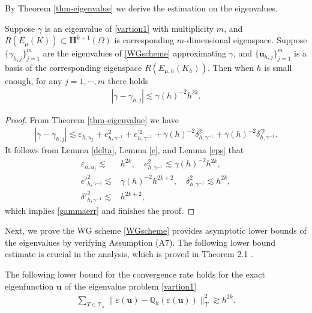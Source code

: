 \documentclass[leqno,CJK]{siamltex704}
\numberwithin{equation}{section}
\def\dQ{{\mathbb{Q}}}
\def\sumT{\sum_{T\in\mathcal{T}_h}}     %
\def\bu{{\mathbf{u}}}
\def\bh{{\mathbf{H}}}
\newcommand{\eps}{\varepsilon}
\begin{document}
By Theorem \ref{thm-eigenvalue} we derive the estimation on the eigenvalues.
\begin{theorem}\label{eigenvalue}
	Suppose $\gamma$ is an eigenvalue of \eqref{vartion1} with multiplicity $m$,
	and $R(E_\mu(K))\subset \bh^{k+1}(\Omega)$ is corresponding $m$-dimensional eigenspace. Suppose $\{\gamma_{h,j}\}_{j=1}^m$
	are the eigenvalues of \eqref{WGscheme} approximating $\gamma$, and $\{\bu_{h,j}\}_{j=1}^m$ is
	a basis of the corresponding eigenspace $R(E_{\mu,h}(K_h))$. Then when $h$ is  small enough, for any $j=1,\cdots,m$ there
	holds
	\begin{eqnarray}\label{gammaerr}
		|\gamma-\gamma_{h,j}|\lesssim \gamma(h)^{-2}h^{2k}.
	\end{eqnarray}
\end{theorem}
\begin{proof}
	From Theorem \ref{thm-eigenvalue} we have
	\begin{eqnarray*}
		|\gamma-\gamma_{h,j}|\lesssim \varepsilon_{h,u_j} + e_{h,\gamma^{-1}}^2 + e^{\prime 2}_{h,\gamma^{-1}}+ \gamma(h)^{-2} \delta_{h,\gamma^{-1}}^2+ \gamma(h)^{-2} \delta^{\prime 2}_{h,\gamma^{-1}}.
	\end{eqnarray*}
	It follows from Lemma \ref{delta}, Lemma \ref{e}, and Lemma \ref{eps} that
	\begin{align*}
		\varepsilon_{h,u_j} \lesssim & h^{2k},\quad
		e_{h,\gamma^{-1}}^2 \lesssim \gamma(h)^{-2}h^{2k},
		\\
		e'^2_{h,\gamma^{-1}} \lesssim & \gamma(h)^{-2}h^{2k+2},\quad
		\delta_{h,\gamma^{-1}}^2\lesssim h^{2k},
		\\
		\delta'^2_{h,\gamma^{-1}} \lesssim & h^{2k+2},
	\end{align*}
	which implies \eqref{gammaerr} and finishes the proof.
\end{proof}

Next, we prove the WG scheme \eqref{WGscheme} provides asymptotic lower bounds of the eigenvalues by verifying Assumption (A7). The following lower bound estimate is crucial in the analysis, which is proved in Theorem 2.1 \cite{Lin2011a}.
\begin{lemma}\label{lowerbound}
	The following lower bound for the convergence rate holds for the exact eigenfunction $\bu$ of the eigenvalue problem \eqref{vartion1}
	\begin{eqnarray*}
		\sumT\|\eps(\bu)-\dQ_h(\eps(\bu))\|_T^2\gtrsim h^{2k}.
	\end{eqnarray*}
\end{lemma}
\end{document}
